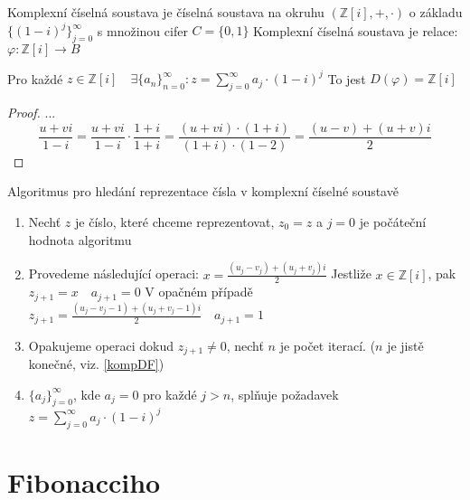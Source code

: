 \documentclass[czech,bachelor,dept470,male]{diploma}
\begin{document}
\begin{definition}
	Komplexní číselná soustava je číselná soustava na okruhu $(\mathbb{Z}[i],+,\cdot)$ o základu $\{(1-i)^j\}_{j=0}^\infty$ s množinou cifer $C=\{0,1\}$\newline
	\newline
	Komplexní číselná soustava je relace:
	$\varphi:\mathbb{Z}[i]\to B$
\end{definition}

\begin{theorem}
	Pro každé $z \in \mathbb{Z}[i] \quad \exists\{a_n\}_{n=0}^\infty:z=
	\sum_{j=0}^{\infty}a_j\cdot(1-i)^j$
	To jest $D(\varphi)=\mathbb{Z}[i]$
\end{theorem}
\begin{proof}\label{kompDF}
	...
	$$\frac{u+vi}{1-i}=\frac{u+vi}{1-i}\cdot\frac{1+i}{1+i} = \frac{(u+vi)\cdot(1+i)}{(1+i)\cdot(1-2)}=\frac{(u-v)+(u+v)i}{2}$$
\end{proof}
\begin{remark} Algoritmus pro hledání reprezentace čísla v komplexní číselné soustavě
	\begin{enumerate}
		\item Nechť $z$ je číslo, které chceme reprezentovat, $z_0 = z$ a $j=0$ je počáteční hodnota algoritmu	
		\item Provedeme následující operaci:\newline
		$x = \frac{(u_j-v_j)+(u_j+v_j)i}{2}$\newline
		Jestliže $x \in \mathbb{Z}[i]$, pak $z_{j+1} = x \quad a_{j+1}=0$\newline
		V opačném případě $z_{j+1} = \frac{(u_j-v_j-1)+(u_j+v_j-1)i}{2}\quad a_{j+1}=1$
		\item Opakujeme operaci dokud $z_{j+1}\ne0$, nechť $n$ je počet iterací. ($n$ je jistě konečné, viz. \ref{kompDF})
		\item $\{a_j\}_{j=0}^{\infty}$, kde $a_j=0$ pro každé $j>n$, splňuje požadavek $z=
		\sum_{j=0}^{\infty}a_j\cdot(1-i)^j$
	\end{enumerate}
\end{remark}

\section{Fibonacciho}
\end{document}
